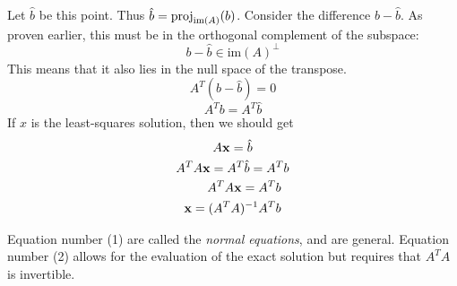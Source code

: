 \documentclass{article}
\newcommand{\pj}{\text{\normalfont proj}}
\begin{document}
Let $\hat{b}$ be this point. Thus $\hat{b} = \pj_{\text{im}(A)}(b)$. Consider the difference $b - \hat{b}$. As proven earlier, this must be in the orthogonal complement of the subspace:
\[b - \hat{b} \in \text{im}(A)^\perp\]
This means that it also lies in the null space of the transpose.
\[A^T(b - \hat{b}) = 0\]
\[A^T b = A^T \hat{b}\]
If $x$ is the least-squares solution, then we should get
\[A\mathbf{x} = \hat{b}\]
\[A^T A \mathbf{x} = A^T \hat{b} = A^T b\]
\begin{align}
    A^T A \mathbf{x} = A^T b \\
    \mathbf{x} = (A^T A)^{-1}A^T b
\end{align}

Equation number (1) are called the \emph{normal equations}, and are general. Equation number (2) allows for the evaluation of the exact solution but requires that $A^T A$ is invertible.
\end{document}
